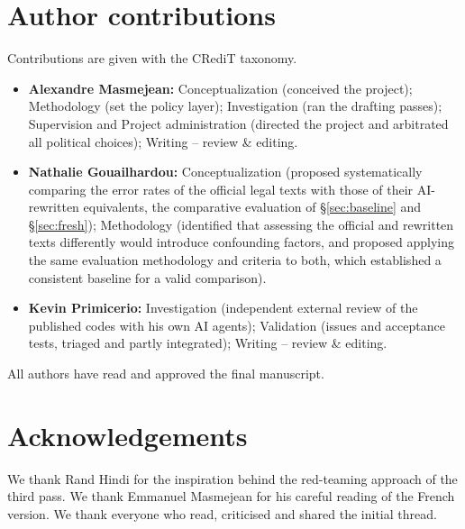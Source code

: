 \documentclass[11pt,a4paper]{article}
\begin{document}
\section*{Author contributions}

Contributions are given with the CRediT taxonomy.
\begin{itemize}
  \item \textbf{Alexandre Masmejean:} Conceptualization (conceived the project); Methodology (set the policy layer); Investigation (ran the drafting passes); Supervision and Project administration (directed the project and arbitrated all political choices); Writing -- review \& editing.
  \item \textbf{Nathalie Gouailhardou:} Conceptualization (proposed systematically comparing the error rates of the official legal texts with those of their AI-rewritten equivalents, the comparative evaluation of \S\ref{sec:baseline} and \S\ref{sec:fresh}); Methodology (identified that assessing the official and rewritten texts differently would introduce confounding factors, and proposed applying the same evaluation methodology and criteria to both, which established a consistent baseline for a valid comparison).
  \item \textbf{Kevin Primicerio:} Investigation (independent external review of the published codes with his own AI agents); Validation (issues and acceptance tests, triaged and partly integrated); Writing -- review \& editing.
\end{itemize}
All authors have read and approved the final manuscript.

\section*{Acknowledgements}

We thank Rand Hindi for the inspiration behind the red-teaming approach of the third pass. We thank Emmanuel Masmejean for his careful reading of the French version. We thank everyone who read, criticised and shared the initial thread.
\end{document}
